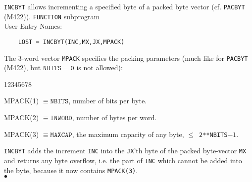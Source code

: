                          
               
\Submitter{}                             
    
{\tt INCBYT} allows incrementing a specified byte of a packed byte
vector (cf. {\tt PACBYT} (M422)).
\Structure
{\tt FUNCTION} subprogram \\
User Entry Names: 
\Usage
\begin{verbatim}
    LOST = INCBYT(INC,MX,JX,MPACK)
\end{verbatim}
The 3-word vector {\tt MPACK} specifies the packing parameters
(much like for {\tt PACBYT} (M422),
but $\mathtt{NBITS=0}$ is not allowed):
\begin{DLtt}{12345678}
\item [MPACK(1)] $\mathtt{\equiv NBITS}$, number of bits per byte.
\item [MPACK(2)] $\mathtt{\equiv INWORD}$, number of bytes per word.
\item [MPACK(3)] $\mathtt{\equiv MAXCAP}$, the maximum capacity of any byte,
{\tt $\leq$ 2**NBITS$-1$}.
\end{DLtt}
{\tt INCBYT} adds the increment {\tt INC} into the {\tt JX}'th byte of
the packed byte-vector {\tt MX} and returns any byte overflow,
i.e. the part of {\tt INC} which cannot be added into the byte,
because it now contains {\tt MPACK(3)}.
\\ $\bullet$
